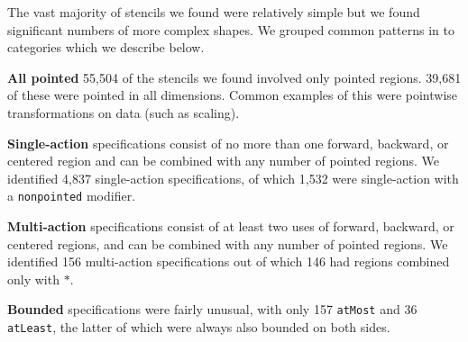 \documentclass[10pt,preprint,numbers]{sigplanconf}
\theoremstyle{definition}
\newcommand{\term}[1]{\texttt{#1}}
\begin{document}





%


The vast majority of stencils we found were relatively simple but we
found significant numbers of more complex shapes. We grouped common
patterns in to categories which we describe below.

\textbf{All pointed} 55,504 of the stencils we found involved 
only pointed regions. 39,681 of these were pointed in all
dimensions. Common examples of this were pointwise transformations on
data (such as scaling).

\textbf{Single-action} specifications consist of no more than one 
forward, backward, or centered region and can be combined with any
number of pointed regions. We identified 4,837 single-action
specifications, of which 1,532 were single-action with a
\texttt{nonpointed} modifier.

\textbf{Multi-action} specifications consist of at least two uses 
of forward, backward, or centered regions, and can be combined with
any number of pointed regions. We identified 156 multi-action
specifications out of which 146 had regions combined only with
$\term{*}$.

\textbf{Bounded} specifications were fairly unusual, with only 157
\texttt{atMost} and 36 \texttt{atLeast}, the latter of which were
always also bounded on both sides.
\end{document}
